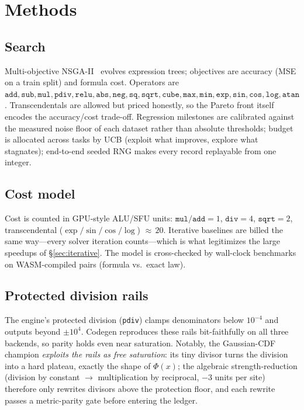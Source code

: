 \documentclass[11pt]{article}
\begin{document}
\section{Methods}
\subsection{Search}
Multi-objective NSGA-II~\cite{deb2002nsga2} evolves expression trees; objectives are accuracy (MSE on a train split) and formula cost. Operators are $\texttt{add}, \texttt{sub}, \texttt{mul}, \texttt{pdiv}, \texttt{relu}, \texttt{abs}, \texttt{neg}, \texttt{sq}, \texttt{sqrt}, \texttt{cube}, \texttt{max}, \texttt{min}, \texttt{exp}, \texttt{sin}, \texttt{cos}, \texttt{log}, \texttt{atan}$. Transcendentals are allowed but priced honestly, so the Pareto front itself encodes the accuracy/cost trade-off. Regression milestones are calibrated against the measured noise floor of each dataset rather than absolute thresholds; budget is allocated across tasks by UCB (exploit what improves, explore what stagnates); end-to-end seeded RNG makes every record replayable from one integer.

\subsection{Cost model}
Cost is counted in GPU-style ALU/SFU units: $\texttt{mul}/\texttt{add}=1$, $\texttt{div}=4$, $\texttt{sqrt}=2$, transcendental ($\exp/\sin/\cos/\log$) ${\approx}\,20$. Iterative baselines are billed the same way---every solver iteration counts---which is what legitimizes the large speedups of \S\ref{sec:iterative}. The model is cross-checked by wall-clock benchmarks on WASM-compiled pairs (formula vs.\ exact law).

\subsection{Protected division rails}
The engine's protected division (\texttt{pdiv}) clamps denominators below $10^{-4}$ and outputs beyond $\pm 10^{4}$. Codegen reproduces these rails bit-faithfully on all three backends, so parity holds even near saturation. Notably, the Gaussian-CDF champion \emph{exploits the rails as free saturation}: its tiny divisor turns the division into a hard plateau, exactly the shape of $\Phi(x)$; the algebraic strength-reduction (division by constant $\to$ multiplication by reciprocal, $-3$ units per site) therefore only rewrites divisors above the protection floor, and each rewrite passes a metric-parity gate before entering the ledger.
\end{document}
